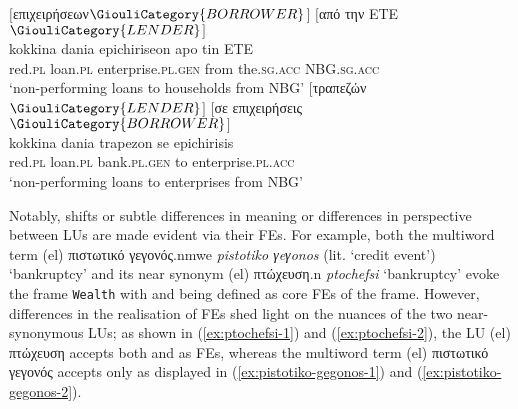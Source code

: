 \documentclass[output=paper,colorlinks,citecolor=brown]{langscibook}
\begin{document}
\ea
\label{ex:kokina-dania-annot-1}
\glll
{}  {$[$επιχειρήσεων$\GiouliCategory{BORROWER}$$]$} $[$από την ΕΤΕ$\GiouliCategory{LENDER}$$]$\\
{kokkina} {dania} {epichiriseon} {apo} {tin} {ETE}\\
{red.\textsc{pl}} {loan.\textsc{pl}} {enterprise.\textsc{pl.gen}} {from} {the.\textsc{sg.acc}} {NBG.\textsc{sg.acc}}\\
\glt ‘non-performing loans to households from NBG’
\ex
\label{ex:kokina-dania-annot-2}
\glll
{}  {$[$τραπεζών$\GiouliCategory{LENDER}$$]$} {$[$σε επιχειρήσεις$\GiouliCategory{BORROWER}$$]$} \\
{kokkina} {dania} {trapezon} {se epichirisis} \\
{red.\textsc{pl}} {loan.\textsc{pl}} {bank.\textsc{pl.gen}} {to enterprise.\textsc{pl.acc}} \\
\glt ‘non-performing loans to enterprises from NBG’
\z

\begin{sloppypar}
Notably, shifts or subtle differences in meaning or differences in perspective between LUs are made evident via their FEs. For example, both the multiword term (el) {{πιστωτικό}} {{γεγονός}}.nmwe \textit{pistotiko γeγonos} (lit. `credit event') `bank\-ruptcy' and its near synonym (el) πτώχευση.n \textit{ptochefsi} `bankruptcy' evoke the frame \texttt{Wealth} with  and  being defined as core FEs of the frame. However, differences in the realisation of FEs shed light on the nuances of the two near-synonymous LUs; as shown in (\ref{ex:ptochefsi-1}) and (\ref{ex:ptochefsi-2}), the LU (el) πτώχευση accepts both  and  as FEs, whereas the multiword term (el) {{πιστωτικό}} {{γεγονός}} accepts only  as displayed in (\ref{ex:pistotiko-gegonos-1}) and (\ref{ex:pistotiko-gegonos-2}).
\end{sloppypar}
\end{document}

